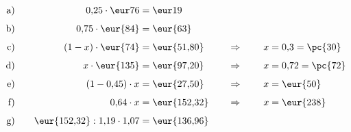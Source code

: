 \begin{exercise}
      \newcommand{\eqAB}{\noeq}
      \newcommand{\eqAC}{\noeq}
      \newcommand{\eqBA}{0,\!75\cdot\text{\eur{84}}&=\text{\eur{63}}}
      \newcommand{\eqBB}{\noeq}
      \newcommand{\eqBC}{\noeq}
      \newcommand{\eqCA}{(1-x)\cdot\text{\eur{74}}&=\text{\eur{51,80}}}
      \newcommand{\eqCB}{\quad&\Rightarrow\quad}
      \newcommand{\eqCC}{x&=0,\!3=\text{\pc{30}}}
      \newcommand{\eqDA}{x\cdot\text{\eur{135}}&=\text{\eur{97,20}}}
      \newcommand{\eqDB}{\quad&\Rightarrow\quad}
      \newcommand{\eqDC}{x&=0,\!72=\text{\pc{72}}}
      \newcommand{\eqEA}{(1-0,\!45)\cdot x&=\text{\eur{27,50}}}
      \newcommand{\eqEB}{\quad&\Rightarrow\quad}
      \newcommand{\eqEC}{x&=\text{\eur{50}}}
      \newcommand{\eqFA}{0,\!64\cdot x&=\text{\eur{152,32}}}
      \newcommand{\eqFB}{\quad&\Rightarrow\quad}
      \newcommand{\eqFC}{x&=\text{\eur{238}}}
      \newcommand{\eqGA}{\text{\eur{152,32}}:1,\!19\cdot1,\!07&=\text{\eur{136,96}}}
      \newcommand{\eqGB}{\noeq}
      \newcommand{\eqGC}{\noeq}
      \setlength{\abovedisplayskip}{0pt}%
      \begin{alignat*}{4}
        \text{a)}&\quad & \eqAA & \eqAB & \eqAC \\[1ex]
        \text{b)}&\quad & \eqBA & \eqBB & \eqBC \\[1ex]
        \text{c)}&\quad & \eqCA & \eqCB & \eqCC \\[1ex]
        \text{d)}&\quad & \eqDA & \eqDB & \eqDC \\[1ex]
        \text{e)}&\quad & \eqEA & \eqEB & \eqEC \\[1ex]
        \text{f)}&\quad & \eqFA & \eqFB & \eqFC \\[1ex]
        \text{g)}&\quad & \eqGA & \eqGB & \eqGC
      \end{alignat*}
    \endgroup
  \fi
\end{exercise}
